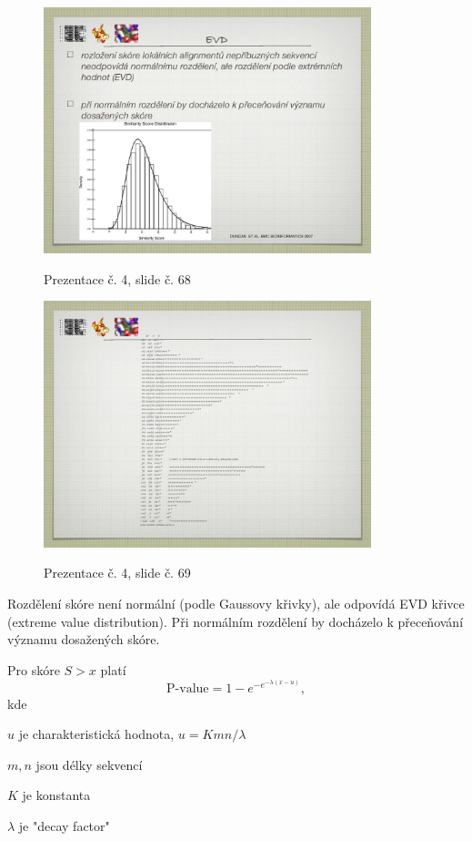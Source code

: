 \documentclass[DIV=8]{scrreprt}
\begin{document}
\begin{description}
\begin{figure}
    \caption{Prezentace č. 4, slide č. 68}
    \includegraphics[width=0.85\textwidth]{slides-4/slide-68.jpg}
    \centering
    \label{slides-4-slide-68}
\end{figure}
\begin{figure}
    \caption{Prezentace č. 4, slide č. 69}
    \includegraphics[width=0.85\textwidth]{slides-4/slide-69.jpg}
    \centering
    \label{slides-4-slide-69}
\end{figure}

Rozdělení skóre není normální (podle Gaussovy křivky), ale odpovídá EVD křivce (extreme value distribution). Při normálním rozdělení by docházelo k přeceňování významu dosažených skóre.

Pro skóre \(S > x\) platí
\[\text{P-value} = 1 - e^{-e^{-\lambda (x - u)}},\]
kde
\begin{myItemize}[nosep]
    \item \(u\) je charakteristická hodnota, \(u = Kmn / \lambda\)
    \item \(m, n\) jsou délky sekvencí
    \item \(K\) je konstanta
    \item \(\lambda\) je "decay factor"
\end{myItemize}



\end{description}
\end{document}
